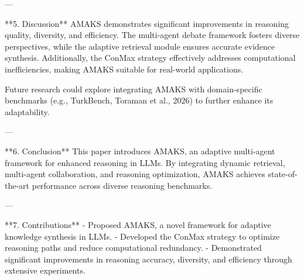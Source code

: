 ---

**5. Discussion**  
AMAKS demonstrates significant improvements in reasoning quality, diversity, and efficiency. The multi-agent debate framework fosters diverse perspectives, while the adaptive retrieval module ensures accurate evidence synthesis. Additionally, the ConMax strategy effectively addresses computational inefficiencies, making AMAKS suitable for real-world applications.  

Future research could explore integrating AMAKS with domain-specific benchmarks (e.g., TurkBench, Toraman et al., 2026) to further enhance its adaptability.  

---

**6. Conclusion**  
This paper introduces AMAKS, an adaptive multi-agent framework for enhanced reasoning in LLMs. By integrating dynamic retrieval, multi-agent collaboration, and reasoning optimization, AMAKS achieves state-of-the-art performance across diverse reasoning benchmarks.  

---

**7. Contributions**  
- Proposed AMAKS, a novel framework for adaptive knowledge synthesis in LLMs.  
- Developed the ConMax strategy to optimize reasoning paths and reduce computational redundancy.  
- Demonstrated significant improvements in reasoning accuracy, diversity, and efficiency through extensive experiments.  